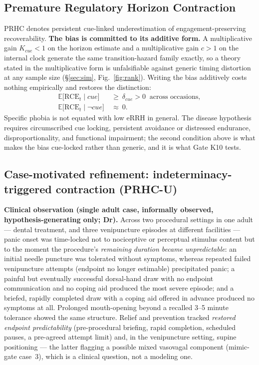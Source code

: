 \documentclass[9pt,twocolumn]{article}
\newcommand{\RCE}{\mathrm{RCE}}
\begin{document}
\subsection{Premature Regulatory Horizon Contraction}
\label{sec:prhc}
PRHC denotes persistent cue-linked underestimation of engagement-preserving recoverability. \textbf{The bias is committed to its additive form.} A multiplicative gain $K_{cue}<1$ on the horizon estimate and a multiplicative gain $c>1$ on the internal clock generate the same transition-hazard family exactly, so a theory stated in the multiplicative form is unfalsifiable against generic timing distortion at any sample size (\S\ref{sec:sim}, Fig.~\ref{fig:rank}). Writing the bias additively costs nothing empirically and restores the distinction:
\begin{align*}
\mathbb{E}\big[\RCE_t\mid cue\big]&\ \ge\ \delta_{cue}>0\ \text{ across occasions},\\[-0.1em]
\mathbb{E}\big[\RCE_t\mid \neg cue\big]&\ \approx\ 0 .
\end{align*}
Specific phobia is not equated with low eRRH in general. The disease hypothesis requires circumscribed cue locking, persistent avoidance or distressed endurance, disproportionality, and functional impairment; the second condition above is what makes the bias cue-locked rather than generic, and it is what Gate K10 tests.

\subsection{Case-motivated refinement: indeterminacy-triggered contraction (PRHC-U)}
\label{sec:prhcu}
\textbf{Clinical observation (single adult case, informally observed, hypothesis-generating only; Dr).} Across two procedural settings in one adult --- dental treatment, and three venipuncture episodes at different facilities --- panic onset was time-locked not to nociceptive or perceptual stimulus content but to the moment the procedure's \emph{remaining duration became unpredictable}: an initial needle puncture was tolerated without symptoms, whereas repeated failed venipuncture attempts (endpoint no longer estimable) precipitated panic; a painful but eventually successful dorsal-hand draw with no endpoint communication and no coping aid produced the most severe episode; and a briefed, rapidly completed draw with a coping aid offered in advance produced no symptoms at all. Prolonged mouth-opening beyond a recalled 3--5 minute tolerance showed the same structure. Relief and prevention tracked \emph{restored endpoint predictability} (pre-procedural briefing, rapid completion, scheduled pauses, a pre-agreed attempt limit) and, in the venipuncture setting, supine positioning --- the latter flagging a possible mixed vasovagal component (mimic-gate case~3), which is a clinical question, not a modeling one.
\end{document}

